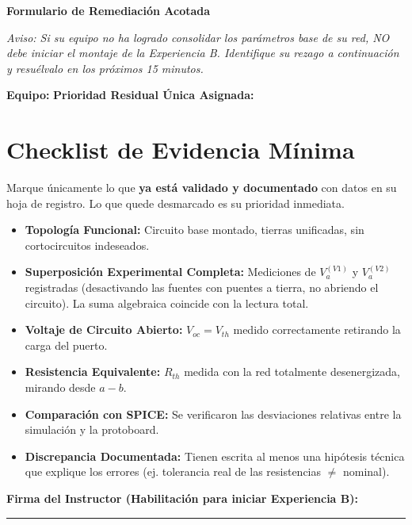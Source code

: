 \documentclass[11pt, a4paper]{article}
\begin{document}
\begin{tcolorbox}[colback=red!5!white, colframe=red!70!black, title=\textbf{Triage Residual: Cierre Obligatorio de Experiencia A}]
    \centering \textbf{Formulario de Remediación Acotada}
\end{tcolorbox}

\noindent \textit{Aviso: Si su equipo no ha logrado consolidar los parámetros base de su red, NO debe iniciar el montaje de la Experiencia B. Identifique su rezago a continuación y resuélvalo en los próximos 15 minutos.}

\vspace{0.4cm}
\textbf{Equipo:} \hrulefill \quad \textbf{Prioridad Residual Única Asignada:} \hrulefill

\vspace{0.5cm}
\section*{Checklist de Evidencia Mínima}
Marque únicamente lo que \textbf{ya está validado y documentado} con datos en su hoja de registro. Lo que quede desmarcado es su prioridad inmediata.

\begin{itemize}\setlength\itemsep{0.3em}
    \item[$\square$] \textbf{Topología Funcional:} Circuito base montado, tierras unificadas, sin cortocircuitos indeseados.
    \item[$\square$] \textbf{Superposición Experimental Completa:} Mediciones de $V_a^{(V1)}$ y $V_a^{(V2)}$ registradas (desactivando las fuentes con puentes a tierra, no abriendo el circuito). La suma algebraica coincide con la lectura total.
    \item[$\square$] \textbf{Voltaje de Circuito Abierto:} $V_{oc} = V_{th}$ medido correctamente retirando la carga del puerto.
    \item[$\square$] \textbf{Resistencia Equivalente:} $R_{th}$ medida con la red totalmente desenergizada, mirando desde $a-b$.
    \item[$\square$] \textbf{Comparación con SPICE:} Se verificaron las desviaciones relativas entre la simulación y la protoboard.
    \item[$\square$] \textbf{Discrepancia Documentada:} Tienen escrita al menos una hipótesis técnica que explique los errores (ej. tolerancia real de las resistencias $\neq$ nominal).
\end{itemize}

\vspace{1cm}
\begin{center}
    \textbf{Firma del Instructor (Habilitación para iniciar Experiencia B):} \rule{6cm}{0.4pt}
\end{center}
\end{document}
